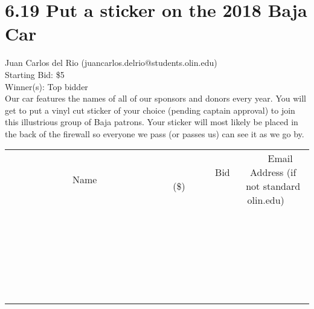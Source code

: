 \documentclass[11pt]{article}
\begin{document}
\section*{6.19 Put a sticker on the 2018 Baja Car}
Juan Carlos del Rio (juancarlos.delrio@students.olin.edu) \\
Starting Bid: \$5 \\
Winner(s): 
Top bidder \\
Our car features the names of all of our sponsors and donors every year. You will get to put a vinyl cut sticker of your choice (pending captain approval) to join this illustrious group of Baja patrons. Your sticker will most likely be placed in the back of the firewall so everyone we pass (or passes us) can see it as we go by. \\[6ex]
\begin{tabular}{c c c}
~~~~~~~~~~~~~Name~~~~~~~~~~~~~ & ~~~~~~~~~Bid (\$)~~~~~~~~~ & ~~~Email Address (if not standard olin.edu)~~~ \\
 & & \\
\hline
 & & \\
\hline
 & & \\
\hline
 & & \\
\hline
 & & \\
\hline
 & & \\
\hline
 & & \\
\hline
 & & \\
\hline
 & & \\
\hline
 & & \\
\hline
 & & \\
\hline
 & & \\
\hline
 & & \\
\hline
 & & \\
\hline
 & & \\
\hline
 & & \\
\hline
 & & \\
\hline
 & & \\
\hline
 & & \\
\hline
 & & \\
\hline
 & & \\
\hline
 & & \\
\hline
 & & \\
\hline
 & & \\
\hline
 & & \\
\hline
 & & \\
\hline
\end{tabular}
\clearpage
\end{document}

